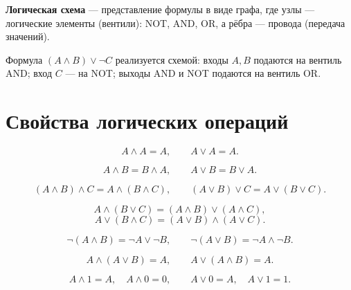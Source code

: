 \documentclass[12pt]{article}
\begin{document}
\begin{definition}
\textbf{Логическая схема} --- представление формулы в виде графа,
где узлы --- логические элементы (вентили): NOT, AND, OR,
а рёбра --- провода (передача значений).
\end{definition}

\begin{example}
Формула $(A \wedge B) \vee \neg C$ реализуется схемой:
входы $A, B$ подаются на вентиль AND; вход $C$ --- на NOT;
выходы AND и NOT подаются на вентиль OR.
\end{example}

\section{Свойства логических операций}\label{sec:logic-props}

\begin{property}[Идемпотентность]
\[
A \wedge A = A, \qquad A \vee A = A.
\]
\end{property}

\begin{property}[Коммутативность]
\[
A \wedge B = B \wedge A, \qquad A \vee B = B \vee A.
\]
\end{property}

\begin{property}[Ассоциативность]
\[
(A \wedge B) \wedge C = A \wedge (B \wedge C),
\qquad
(A \vee B) \vee C = A \vee (B \vee C).
\]
\end{property}

\begin{property}[Дистрибутивность]
\[
A \wedge (B \vee C) = (A \wedge B) \vee (A \wedge C),
\]
\[
A \vee (B \wedge C) = (A \vee B) \wedge (A \vee C).
\]
\end{property}

\begin{property}
\[
\neg(A \wedge B) = \neg A \vee \neg B,
\qquad
\neg(A \vee B) = \neg A \wedge \neg B.
\]
\end{property}

\begin{property}
\[
A \wedge (A \vee B) = A,
\qquad
A \vee (A \wedge B) = A.
\]
\end{property}

\begin{property}
\[
A \wedge 1 = A, \quad A \wedge 0 = 0,
\qquad
A \vee 0 = A, \quad A \vee 1 = 1.
\]
\end{property}
\end{document}
